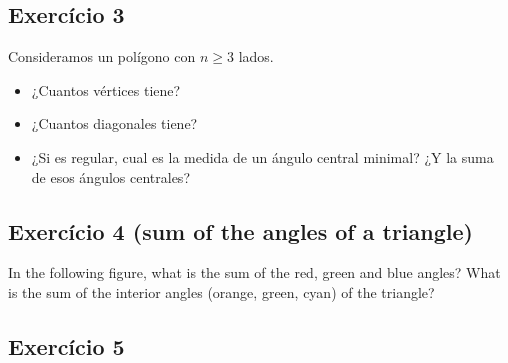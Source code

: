 \subsection{Exercício 3}

Consideramos un polígono con $n \geq 3$ lados.

\begin{itemize}
\item ¿Cuantos vértices tiene?
\item ¿Cuantos diagonales tiene?
\item ¿Si es regular, cual es la medida de un ángulo central minimal?
  ¿Y la suma de esos ángulos centrales?
\end{itemize}

\subsection{Exercício 4 (sum of the angles of a triangle)}

In the following figure, what is the sum of the red, green and blue angles?
What is the sum of the interior angles (orange, green, cyan) of the triangle?

\begin{center}


\end{center}

\subsection{Exercício 5}

